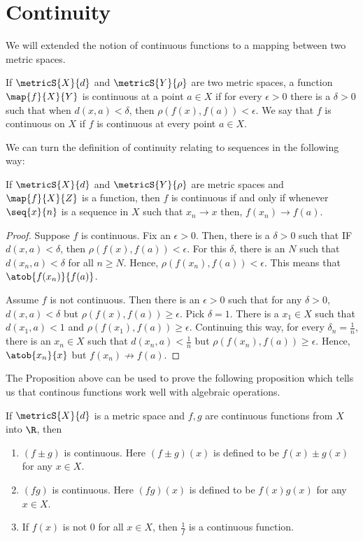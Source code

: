 \section{Continuity}
We will extended the notion of continuous functions to a mapping between two metric spaces.
\begin{Definition}[name=Continuous function]
    If $\metricS{X}{d}$ and $\metricS{Y}{\rho}$ are two metric spaces, a function $\map{f}{X}{Y}$ is
    continuous at a point $a \in X$ if for every $\epsilon > 0$ there is a $\delta > 0$ such that when 
    $d(x,a) < \delta$, then $\rho(f(x),f(a)) < \epsilon$. We say that $f$ is continuous on $X$ if $f$ is
    continuous at every point $a \in X$.
\end{Definition}
We can turn the definition of continuity relating to sequences in the following way:
\begin{Proposition}
    If $\metricS{X}{d}$ and $\metricS{Y}{\rho}$ are metric spaces and $\map{f}{X}{Z}$ is a function, then
    $f$ is continuous if and only if whenever $\seq{x}{n}$ is a sequence in $X$ such that $x_n\to x$ then,
    $f(x_n)\to f(a)$.
\end{Proposition}
\begin{proof}
    Suppose $f$ is continuous. Fix an $\epsilon > 0$. Then, there is a $\delta > 0$ such that IF $d(x,a) <
    \delta$, then $\rho(f(x),f(a)) < \epsilon$. For this $\delta$, there is an $N$ such that $d(x_n,a) <
    \delta$ for all $n \geq N$. Hence, $\rho(f(x_n),f(a)) < \epsilon$. This means that $\atob{f(x_n)}{f(a)}$.

    Assume $f$ is not continuous. Then there is an $\epsilon > 0$ such that for any $\delta > 0$,
    $d(x,a) < \delta$ but $\rho(f(x),f(a)) \geq \epsilon$.
    Pick $\delta = 1$. There is a $x_1 \in X$ such that $d(x_1,a) < 1$ and $\rho(f(x_1),f(a)) \geq \epsilon$.
    Continuing this way, for every $\delta_n = \frac{1}{n}$, there is an $x_n \in X$ such that $d(x_n,a) <
    \frac{1}{n}$ but $\rho(f(x_n),f(a)) \geq \epsilon$. Hence, $\atob{x_n}{x}$ but $f(x_n)\not\to f(a)$.
\end{proof}
The Proposition above can be used to prove the following proposition which tells us that continous functions
work well with algebraic operations.
\begin{Proposition}
    If $\metricS{X}{d}$ is a metric space and $f,g$ are continuous functions from $X$ into $\R$, then
    \begin{enumerate}
	\item
	    $(f\pm g) $ is continuous. Here $(f\pm g)(x)$ is defined to be $f(x)\pm g(x)$ for any $x\in X$.
	\item
	    $(fg)$ is continuous. Here $(fg)(x)$ is defined to be $f(x)g(x)$ for any $x \in X$.
	\item
	    If $f(x)$ is not $0$ for all $x \in X$, then $\frac{1}{f}$ is a continuous function.
    \end{enumerate}
\end{Proposition}
